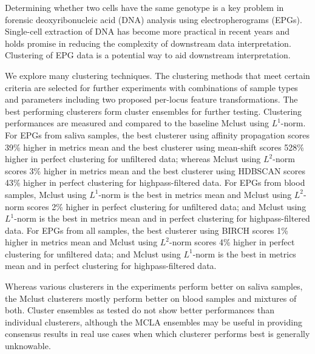 \begin{my_abstract}

Determining whether two cells have the same genotype is a key problem in forensic deoxyribonucleic acid (DNA) analysis using electropherograms (EPGs). Single-cell extraction of DNA has become more practical in recent years and holds promise in reducing the complexity of downstream data interpretation. Clustering of EPG data is a potential way to aid downstream interpretation.

We explore many clustering techniques. The clustering methods that meet certain criteria are selected for further experiments with combinations of sample types and parameters including two proposed per-locus feature transformations. The best performing clusterers form cluster ensembles for further testing. Clustering performances are measured and compared to the baseline Mclust using $L^{1}$-norm. For EPGs from saliva samples, the best clusterer using affinity propagation scores 39\% higher in metrics mean and the best clusterer using mean-shift scores 528\% higher in perfect clustering for unfiltered data; whereas Mclust using $L^{2}$-norm scores 3\% higher in metrics mean and the best clusterer using HDBSCAN scores 43\% higher in perfect clustering for highpass-filtered data. For EPGs from blood samples, Mclust using $L^{1}$-norm is the best in metrics mean and Mclust using $L^{2}$-norm scores 2\% higher in perfect clustering for unfiltered data; and Mclust using $L^{1}$-norm is the best in metrics mean and in perfect clustering for highpass-filtered data. For EPGs from all samples, the best clusterer using BIRCH scores 1\% higher in metrics mean and Mclust using $L^{2}$-norm scores 4\% higher in perfect clustering for unfiltered data; and Mclust using $L^{1}$-norm is the best in metrics mean and in perfect clustering for highpass-filtered data.

Whereas various clusterers in the experiments perform better on saliva samples, the Mclust clusterers mostly perform better on blood samples and mixtures of both. Cluster ensembles as tested do not show better performances than individual clusterers, although the MCLA ensembles may be useful in providing consensus results in real use cases when which clusterer performs best is generally unknowable.

\end{my_abstract}